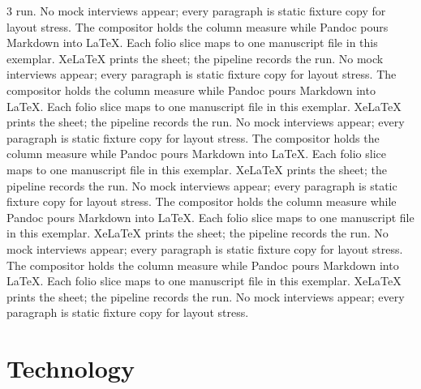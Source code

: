 \documentclass[
]{article}
\begin{document}
\begin{multicols}{3}
run. No mock interviews appear; every paragraph is static fixture copy
for layout stress. The compositor holds the column measure while Pandoc
pours Markdown into LaTeX. Each folio slice maps to one manuscript file
in this exemplar. XeLaTeX prints the sheet; the pipeline records the
run. No mock interviews appear; every paragraph is static fixture copy
for layout stress. The compositor holds the column measure while Pandoc
pours Markdown into LaTeX. Each folio slice maps to one manuscript file
in this exemplar. XeLaTeX prints the sheet; the pipeline records the
run. No mock interviews appear; every paragraph is static fixture copy
for layout stress. The compositor holds the column measure while Pandoc
pours Markdown into LaTeX. Each folio slice maps to one manuscript file
in this exemplar. XeLaTeX prints the sheet; the pipeline records the
run. No mock interviews appear; every paragraph is static fixture copy
for layout stress. The compositor holds the column measure while Pandoc
pours Markdown into LaTeX. Each folio slice maps to one manuscript file
in this exemplar. XeLaTeX prints the sheet; the pipeline records the
run. No mock interviews appear; every paragraph is static fixture copy
for layout stress. The compositor holds the column measure while Pandoc
pours Markdown into LaTeX. Each folio slice maps to one manuscript file
in this exemplar. XeLaTeX prints the sheet; the pipeline records the
run. No mock interviews appear; every paragraph is static fixture copy
for layout stress.

\end{multicols}

\newpage

\section{Technology}\label{technology}
\end{document}

